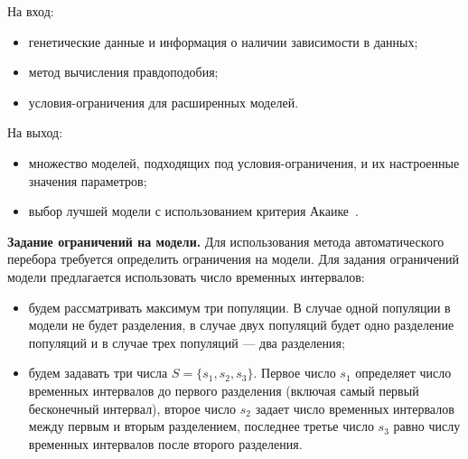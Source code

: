 На вход:
\begin{itemize}
    \item генетические данные и информация о наличии зависимости в данных;
    \item метод вычисления правдоподобия;
    \item условия-ограничения для расширенных моделей.
\end{itemize}

На выход:
\begin{itemize}
    \item множество моделей, подходящих под условия-ограничения, и их настроенные значения параметров;
    \item выбор лучшей модели с использованием критерия Акаике~\cite{akaike1974new}\cite{coffman2016computationally}.\\
\end{itemize}

\textbf{Задание ограничений на модели.}
Для использования метода автоматического перебора требуется определить ограничения на модели.
Для задания ограничений модели предлагается использовать число временных интервалов:
\begin{itemize}
    \item будем рассматривать максимум три популяции. В случае одной популяции в модели не будет разделения, в случае двух популяций будет одно разделение популяций и в случае трех популяций --- два разделения;
    \item будем задавать три числа $S=\{s_1, s_2, s_3\}$. Первое число $s_1$ определяет число временных интервалов до первого разделения (включая самый первый бесконечный интервал), второе число $s_2$ задает число временных интервалов между первым и вторым разделением, последнее третье число $s_3$ равно числу временных интервалов после второго разделения.
\end{itemize}

